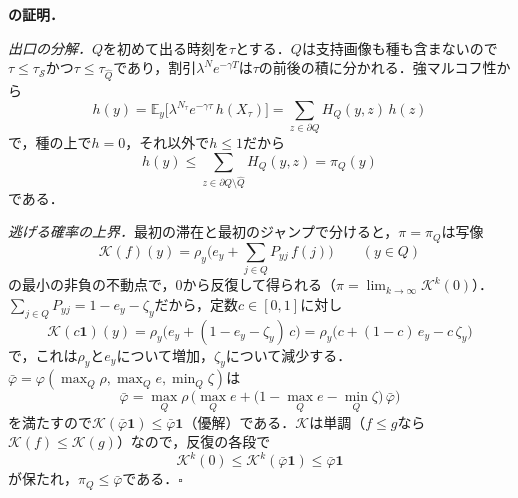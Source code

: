 \appblock
\textbf{\TEscape{}の証明．}

\textit{出口の分解．}$Q$を初めて出る時刻を$\tau$とする．$Q$は支持画像も種も含まないので$\tau\le\tau_{\mathcal{S}}$かつ$\tau\le\tau_{\hat{Q}}$であり，割引$\lambda^{N}e^{-\gamma T}$は$\tau$の前後の積に分かれる．強マルコフ性から
\begin{equation*}
h(y)=\mathbb{E}_y\big[\lambda^{N_\tau}e^{-\gamma\tau}\,h(X_\tau)\big]=\sum_{z\in\partial Q}H_Q(y,z)\,h(z)
\end{equation*}
で，種の上で$h=0$，それ以外で$h\le1$だから
\begin{equation*}
h(y)\le\sum_{z\in\partial Q\setminus\hat{Q}}H_Q(y,z)=\pi_Q(y)
\end{equation*}
である．

\textit{逃げる確率の上界．}最初の滞在と最初のジャンプで分けると，$\pi=\pi_Q$は写像
\begin{equation*}
\mathcal{K}(f)(y)=\rho_y\Big(e_y+\sum_{j\in Q}P_{yj}\,f(j)\Big)\qquad(y\in Q)
\end{equation*}
の最小の非負の不動点で，$0$から反復して得られる（$\pi=\lim_{k\to\infty}\mathcal{K}^k(0)$）．$\sum_{j\in Q}P_{yj}=1-e_y-\zeta_y$だから，定数$c\in[0,1]$に対し
\begin{equation*}
\mathcal{K}(c\mathbf{1})(y)=\rho_y\big(e_y+(1-e_y-\zeta_y)\,c\big)=\rho_y\big(c+(1-c)\,e_y-c\,\zeta_y\big)
\end{equation*}
で，これは$\rho_y$と$e_y$について増加，$\zeta_y$について減少する．$\bar\varphi=\varphi(\max_Q\rho,\max_Qe,\min_Q\zeta)$は
\begin{equation*}
\bar\varphi=\max_Q\rho\,\Big(\max_Qe+\big(1-\max_Qe-\min_Q\zeta\big)\,\bar\varphi\Big)
\end{equation*}
を満たすので$\mathcal{K}(\bar\varphi\mathbf{1})\le\bar\varphi\mathbf{1}$（優解）である．$\mathcal{K}$は単調（$f\le g$なら$\mathcal{K}(f)\le\mathcal{K}(g)$）なので，反復の各段で
\begin{equation*}
\mathcal{K}^k(0)\le\mathcal{K}^k(\bar\varphi\mathbf{1})\le\bar\varphi\mathbf{1}
\end{equation*}
が保たれ，$\pi_Q\le\bar\varphi$である．$\square$

